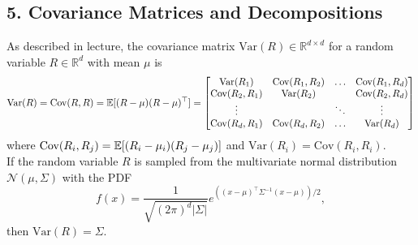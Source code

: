 \documentclass{article}
\renewcommand{\N}{\mathcal{N}}
\renewcommand{\R}{\mathbb{R}}
\newcommand{\Var}{\text{Var}}
\newcommand{\Cov}{\text{Cov}}
\begin{document}
\subsection*{5. Covariance Matrices and Decompositions}
As described in lecture, the covariance matrix $\text{Var}(R) \in \R^{d\times d}$ for a random variable $R \in \R^d$ with mean $\mu$ is
$$
\text{Var}(R) = \text{Cov}(R, R) = \E[(R- \mu)(R-\mu)^{\top}] =
\begin{bmatrix}
\Var(R_1) & \Cov(R_1, R_2) & \ldots & \Cov(R_1, R_d) \\
\Cov(R_2, R_1) & \Var(R_2) & & \Cov(R_2, R_d) \\
\vdots & & \ddots & \vdots \\
\Cov(R_d, R_1) & \Cov(R_d, R_2) & \ldots & \Var(R_d)
\end{bmatrix}
$$
where $\Cov(R_i, R_j) = \E[(R_i - \mu_i)(R_j - \mu_j)]$ and $\Var(R_i) = \Cov(R_i, R_i)$. \\

\noindent
If the random variable $R$ is sampled from the multivariate normal distribution $\N(\mu, \Sigma)$ with the PDF
$$ f(x) = \frac{1}{\sqrt{(2\pi)^d |\Sigma|}} e^{((x-\mu)^{\top}\Sigma^{-1}(x-\mu))/2},$$
then $\Var(R) = \Sigma$.\\
\end{document}
